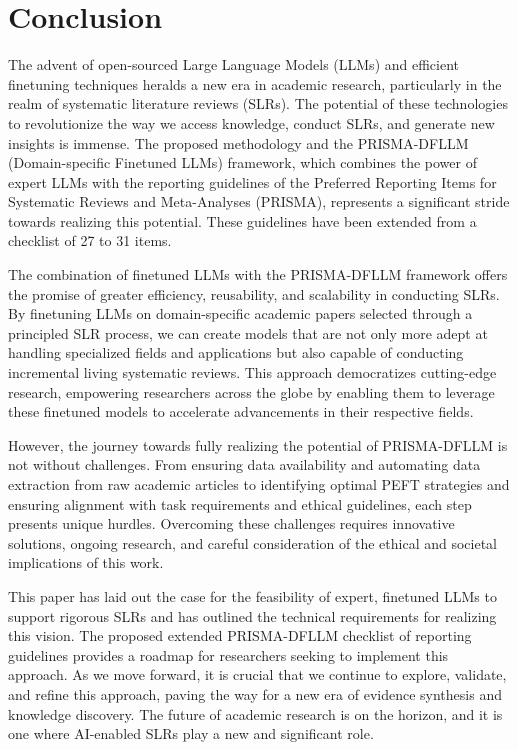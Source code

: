 \documentclass{article}
\begin{document}
\section{Conclusion}

The advent of open-sourced Large Language Models (LLMs) and efficient finetuning techniques heralds a new era in academic research, particularly in the realm of systematic literature reviews (SLRs). The potential of these technologies to revolutionize the way we access knowledge, conduct SLRs, and generate new insights is immense. The proposed methodology and the PRISMA-DFLLM (Domain-specific Finetuned LLMs) framework, which combines the power of expert LLMs with the reporting guidelines of the Preferred Reporting Items for Systematic Reviews and Meta-Analyses (PRISMA), represents a significant stride towards realizing this potential.
These guidelines have been extended from a checklist of 27 to 31 items.

The combination of finetuned LLMs with the PRISMA-DFLLM framework offers the promise of greater efficiency, reusability, and scalability in conducting SLRs. By finetuning LLMs on domain-specific academic papers selected through a principled SLR process, we can create models that are not only more adept at handling specialized fields and applications but also capable of conducting incremental living systematic reviews. This approach democratizes cutting-edge research, empowering researchers across the globe by enabling them to leverage these finetuned models to accelerate advancements in their respective fields.

However, the journey towards fully realizing the potential of PRISMA-DFLLM is not without challenges. From ensuring data availability and automating data extraction from raw academic articles to identifying optimal PEFT strategies and ensuring alignment with task requirements and ethical guidelines, each step presents unique hurdles. Overcoming these challenges requires innovative solutions, ongoing research, and careful consideration of the ethical and societal implications of this work.

This paper has laid out the case for the feasibility of expert, finetuned LLMs to support rigorous SLRs and has outlined the technical requirements for realizing this vision. The proposed extended PRISMA-DFLLM checklist of reporting guidelines provides a roadmap for researchers seeking to implement this approach. As we move forward, it is crucial that we continue to explore, validate, and refine this approach, paving the way for a new era of evidence synthesis and knowledge discovery. The future of academic research is on the horizon, and it is one where AI-enabled SLRs play a new and significant role.
\end{document}
